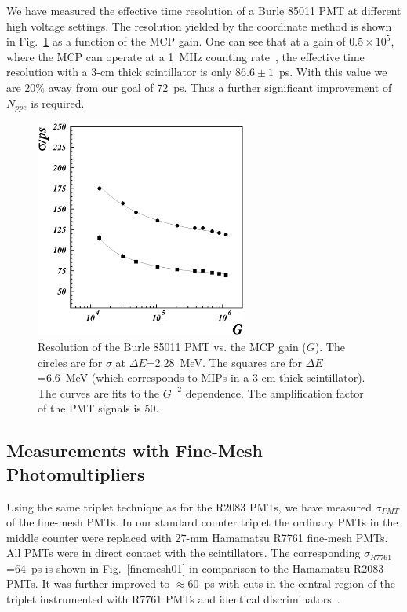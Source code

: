 We have measured the effective time resolution of a Burle 85011 PMT at 
different high voltage settings.  The resolution yielded by the coordinate 
method is shown in Fig.~\ref{sigmamip85011} as a function of the MCP gain. 
One can see that at a gain of $0.5\times10^5$, where the MCP can operate 
at a 1~MHz counting rate~\cite{Baturin:2005}, the effective time resolution 
with a 3-cm thick scintillator is only $86.6 \pm 1$~ps.  With this value we 
are 20\% away from our goal of 72~ps.  Thus a further significant 
improvement of $N_{ppe}$ is required.

\begin{figure}[htbp]
\centering
\includegraphics[width=0.62\textwidth]{res85011vsgain_picture85011.ps}
\caption{\small{Resolution of the Burle 85011 PMT vs. the MCP gain ($G$).  
The circles are for $\sigma$ at $\Delta E$=2.28~MeV.  The squares are for 
$\Delta E$=6.6~MeV (which corresponds to MIPs in a 3-cm thick scintillator). 
The curves are fits to the $G^{-2}$ dependence.  The amplification factor 
of the PMT signals is 50.}}
\label{sigmamip85011}
\end{figure}

\subsection{Measurements with Fine-Mesh Photomultipliers}
\label{secfinemesh}

Using the same triplet technique as for the R2083 PMTs, we have measured 
$\sigma_{PMT}$ of the fine-mesh PMTs.  In our standard counter triplet
\cite{Baturin:2005,llg} the ordinary PMTs in the middle counter were 
replaced with 27-mm Hamamatsu R7761 fine-mesh PMTs.  All PMTs were in 
direct contact with the scintillators.  The corresponding 
$\sigma_{R7761}$=64~ps is shown in Fig.~\ref{finemesh01} in comparison to 
the Hamamatsu R2083 PMTs.  It was further improved to $\approx$60~ps 
with cuts in the central region of the triplet instrumented with R7761 
PMTs and identical discriminators~\cite{kuznetsov}.

